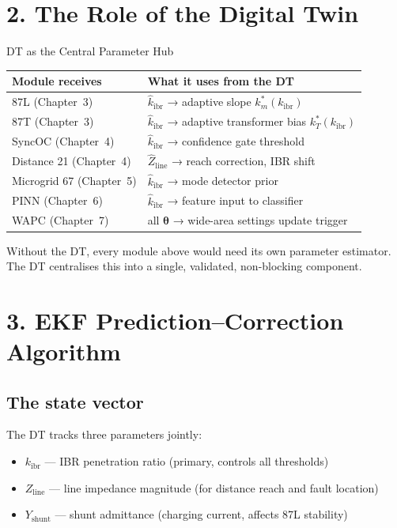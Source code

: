 \documentclass[12pt,a4paper]{article}
\newcommand{\kibr}{k_\mathrm{ibr}}
\begin{document}
\section{2.\; The Role of the Digital Twin}

\begin{archbox}{DT as the Central Parameter Hub}
\begin{center}
\begin{tabular}{@{}lp{9cm}@{}}
\toprule
\textbf{Module receives} & \textbf{What it uses from the DT}\\
\midrule
87L (Chapter~3) & $\hat{k}_\mathrm{ibr}$ → adaptive slope $k_m^*(\kibr)$\\
87T (Chapter~3) & $\hat{k}_\mathrm{ibr}$ → adaptive transformer bias $k_T^*(\kibr)$\\
SyncOC (Chapter~4) & $\hat{k}_\mathrm{ibr}$ → confidence gate threshold\\
Distance 21 (Chapter~4) & $\hat{Z}_\mathrm{line}$ → reach correction, IBR shift\\
Microgrid 67 (Chapter~5) & $\hat{k}_\mathrm{ibr}$ → mode detector prior\\
PINN (Chapter~6) & $\hat{k}_\mathrm{ibr}$ → feature input to classifier\\
WAPC (Chapter~7) & all $\boldsymbol{\theta}$ → wide-area settings update trigger\\
\bottomrule
\end{tabular}
\end{center}
Without the DT, every module above would need its own parameter estimator.
The DT centralises this into a single, validated, non-blocking component.
\end{archbox}

\section{3.\; EKF Prediction--Correction Algorithm}

\subsection{The state vector}

The DT tracks three parameters jointly:
\begin{itemize}[nosep]
  \item $k_\mathrm{ibr}$ — IBR penetration ratio (primary, controls all thresholds)
  \item $Z_\mathrm{line}$ — line impedance magnitude (for distance reach and fault location)
  \item $Y_\mathrm{shunt}$ — shunt admittance (charging current, affects 87L stability)
\end{itemize}
\end{document}
